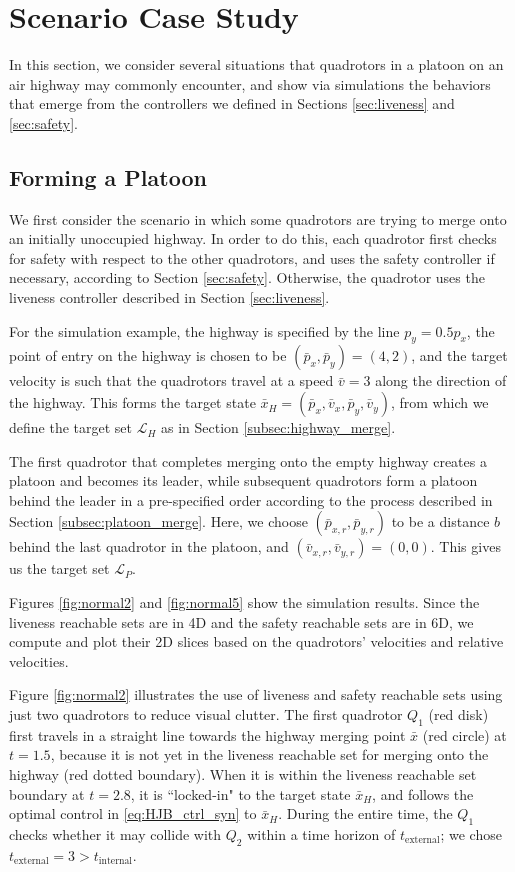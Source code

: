 \section{Scenario Case Study \label{sec:scenarios}}
In this section, we consider several situations that quadrotors in a platoon on an air highway may commonly encounter, and show via simulations the behaviors that emerge from the controllers we defined in Sections \ref{sec:liveness} and \ref{sec:safety}.

\subsection{Forming a Platoon}
We first consider the scenario in which some quadrotors are trying to merge onto an initially unoccupied highway. In order to do this, each quadrotor first checks for safety with respect to the other quadrotors, and uses the safety controller if necessary, according to Section \ref{sec:safety}. Otherwise, the quadrotor uses the liveness controller described in Section \ref{sec:liveness}. 

For the simulation example, the highway is specified by the line $p_y = 0.5p_x$, the point of entry on the highway is chosen to be $(\bar{p}_x, \bar{p}_y) = (4,2)$, and the target velocity is such that the quadrotors travel at a speed $\bar{v}=3$ along the direction of the highway. This forms the target state $\bar{x}_H=(\bar{p}_x, \bar{v}_x, \bar{p}_y, \bar{v}_y)$, from which we define the target set $\mathcal{L}_H$ as in Section \ref{subsec:highway_merge}.

The first quadrotor that completes merging onto the empty highway creates a platoon and becomes its leader, while subsequent quadrotors form a platoon behind the leader in a pre-specified order according to the process described in Section \ref{subsec:platoon_merge}. Here, we choose $(\bar{p}_{x,r}, \bar{p}_{y,r})$ to be a distance $b$ behind the last quadrotor in the platoon, and $(\bar{v}_{x,r}, \bar{v}_{y,r}) = (0,0)$. This gives us the target set $\mathcal{L}_P$.

Figures \ref{fig:normal2} and \ref{fig:normal5} show the simulation results. Since the liveness reachable sets are in 4D and the safety reachable sets are in 6D, we compute and plot their 2D slices based on the quadrotors' velocities and relative velocities. 

Figure \ref{fig:normal2} illustrates the use of liveness and safety reachable sets using just two quadrotors to reduce visual clutter. The first quadrotor $Q_1$ (red disk) first travels in a straight line towards the highway merging point $\bar{x}$ (red circle) at $t=1.5$, because it is not yet in the liveness reachable set for merging onto the highway (red dotted boundary). When it is within the liveness reachable set boundary at $t=2.8$, it is ``locked-in" to the target state $\bar{x}_H$, and follows the optimal control in \eqref{eq:HJB_ctrl_syn} to $\bar{x}_H$. During the entire time, the $Q_1$ checks whether it may collide with $Q_2$ within a time horizon of $t_\text{external}$; we chose $t_\text{external}=3>t_\text{internal}$. 

